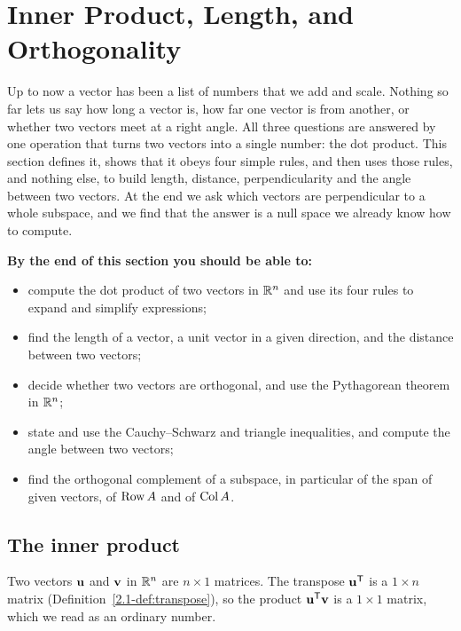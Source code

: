 \documentclass[11pt]{article}
\begin{document}
\section{Inner Product, Length, and Orthogonality}

\begin{guide}
Up to now a vector has been a list of numbers that we add and scale. Nothing so far lets us say how long a vector is, how far one vector is from another, or whether two vectors meet at a right angle. All three questions are answered by one operation that turns two vectors into a single number: the dot product. This section defines it, shows that it obeys four simple rules, and then uses those rules, and nothing else, to build length, distance, perpendicularity and the angle between two vectors. At the end we ask which vectors are perpendicular to a whole subspace, and we find that the answer is a null space we already know how to compute.
\end{guide}

\textbf{By the end of this section you should be able to:}
\begin{itemize}
  \item compute the dot product of two vectors in $\mathbb{R}^n$ and use its four rules to expand and simplify expressions;
  \item find the length of a vector, a unit vector in a given direction, and the distance between two vectors;
  \item decide whether two vectors are orthogonal, and use the Pythagorean theorem in $\mathbb{R}^n$;
  \item state and use the Cauchy--Schwarz and triangle inequalities, and compute the angle between two vectors;
  \item find the orthogonal complement of a subspace, in particular of the span of given vectors, of $\operatorname{Row} A$ and of $\operatorname{Col} A$.
\end{itemize}

\subsection*{The inner product}

Two vectors $\mathbf{u}$ and $\mathbf{v}$ in $\mathbb{R}^n$ are $n\times1$ matrices. The transpose $\mathbf{u}^{\mathsf T}$ is a $1\times n$ matrix (Definition~\ref{2.1-def:transpose}), so the product $\mathbf{u}^{\mathsf T}\mathbf{v}$ is a $1\times1$ matrix, which we read as an ordinary number.
\end{document}
